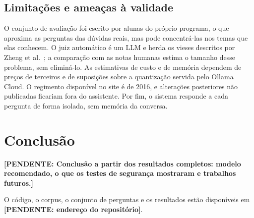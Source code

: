 \documentclass{sbc-template}
\newcommand{\pendente}[1]{\textbf{[PENDENTE: #1]}}
\begin{document}
\subsection{Limitações e ameaças à validade}

O conjunto de avaliação foi escrito por alunas do próprio programa, o que aproxima as
perguntas das dúvidas reais, mas pode concentrá-las nos temas que elas conhecem. O
juiz automático é um LLM e herda os vieses descritos por Zheng et al.~\cite{Zheng2023}; a
comparação com as notas humanas estima o tamanho desse problema, sem eliminá-lo. As
estimativas de custo e de memória dependem de preços de terceiros e de suposições
sobre a quantização servida pelo Ollama Cloud. O regimento disponível no site é de
2016, e alterações posteriores não publicadas ficariam fora do assistente. Por fim, o
sistema responde a cada pergunta de forma isolada, sem memória da conversa.

\section{Conclusão}
\label{sec:conclusao}

\pendente{Conclusão a partir dos resultados completos: modelo recomendado, o que os
testes de segurança mostraram e trabalhos futuros.}

O código, o corpus, o conjunto de perguntas e os resultados estão disponíveis em
\pendente{endereço do repositório}.



\end{document}
